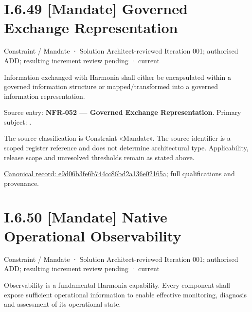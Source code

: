 \section*{I.6.49 [Mandate] Governed Exchange Representation}
\label{navigation:I.6.49}

\label{element:e9d06b3fe6b744cc86bd2a136e02165a}
{\small Constraint / Mandate · Solution Architect-reviewed Iteration 001; authorised ADD; resulting increment review pending · current}\par

Information exchanged with Harmonia shall either be encapsulated within a governed information structure or mapped/transformed into a governed information representation.



Source entry: \textbf{NFR-052 — Governed Exchange Representation}. Primary subject: \texttt{}.



The source classification is Constraint «Mandate». The source identifier is a scoped register reference and does not determine architectural type. Applicability, release scope and unresolved thresholds remain as stated above.


{\footnotesize \href{../../../../../../../continuum/motivation/constraint/mandate/e9d06b3fe6b744cc86bd2a136e02165a.md}{Canonical record: e9d06b3fe6b744cc86bd2a136e02165a}; full qualifications and provenance.}\par
\section*{I.6.50 [Mandate] Native Operational Observability}
\label{navigation:I.6.50}

\label{element:151906f8acad4519b7f9204cce9fc758}
{\small Constraint / Mandate · Solution Architect-reviewed Iteration 001; authorised ADD; resulting increment review pending · current}\par

Observability is a fundamental Harmonia capability. Every component shall expose sufficient operational information to enable effective monitoring, diagnosis and assessment of its operational state.



